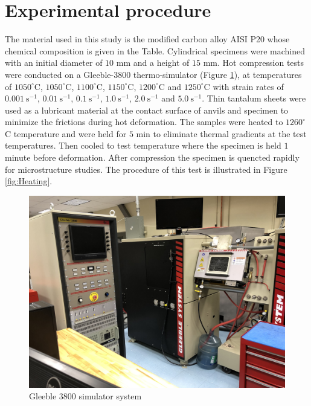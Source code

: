 \documentclass[twoside,english,1p,final,sort&compress]{elsarticle}
\theoremstyle{plain}
\begin{document}
\section{Experimental procedure}
The material used in this study is the modified carbon alloy AISI P20 whose chemical composition is given in the Table. Cylindrical specimens were machined with an initial diameter of $10$ mm and a height of $15$ mm. Hot compression tests were conducted on a Gleeble-3800 thermo-simulator (Figure \ref{fig:Gleeble3800}), at temperatures of $1050^\circ$C,  $1050^\circ$C,  $1100^\circ$C,  $1150^\circ$C,  $1200^\circ$C and  $1250^\circ$C with strain rates of $0.001\ \text{s}^{-1}$, $0.01\ \text{s}^{-1}$, $0.1\ \text{s}^{-1}$, $1.0\ \text{s}^{-1}$, $2.0\ \text{s}^{-1}$ and $5.0\ \text{s}^{-1}$. Thin tantalum sheets were used as a lubricant material at the contact surface of anvils and specimen to minimize the frictions during hot deformation. The samples were heated to $1260^\circ$C temperature and were held for $5$ min to eliminate thermal gradients at the test temperatures. Then cooled to test temperature where the specimen is held $1$ minute before deformation. After compression the specimen is quencted rapidly for microstructure studies. The procedure of this test is illustrated in Figure \ref{fig:Heating}.
\begin{figure}[!ht]
\centering
\includegraphics[width=0.9\columnwidth]
{newFigures/Gleeble-3}
\caption{Gleeble 3800 simulator system}
\label{fig:Gleeble3800}
\end{figure}
\end{document}
